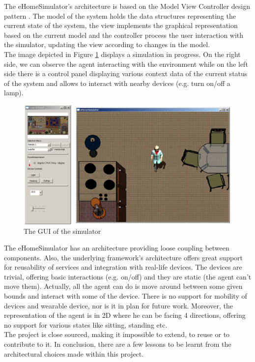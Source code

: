 The eHomeSimulator's architecture is based on the Model View Controller design pattern \cite{erich1995design}. The model of the system holds the data structures representing the current state of the system, the view implements the graphical representation based on the current model and the controller process the user interaction with the simulator, updating the view according to changes in the model.\\

The image depicted in Figure \ref{fig:simulated_env} displays a simulation in progress. On the right side, we can observe the agent interacting with the environment while on the left side there is a control panel displaying various context data of the current status of the system and allows to interact with nearby devices (e.g. turn on/off a lamp).

\begin{figure}[H]
	\centering
	\includegraphics[width=\linewidth]{gfx/Chapter2/simulated_env}
	\caption{The GUI of the simulator}
\label{fig:simulated_env}
\end{figure}

The eHomeSimulator has an architecture providing loose coupling between components. Also, the underlying framework's architecture offers great support for reusability of services and integration with real-life devices. The devices are trivial, offering basic interactions (e.g. on/off) and they are static (the agent can't move them). Actually, all the agent can do is move around between some given bounds and interact with some of the device. There is no support for mobility of devices and wearable device, nor is it in plan for future work. Moreover, the representation of the agent is in 2D where he can be facing 4 directions, offering no support for various states like sitting, standing etc.\\

The project is close sourced, making it impossible to extend, to reuse or to contribute to it. In conclusion, there are a few lessons to be learnt from the architectural choices made within this project.

